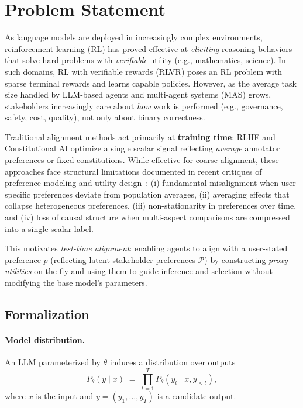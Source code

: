 \documentclass[sigconf]{acmart}
\begin{document}
\section{Problem Statement}\label{sec:problem}

As language models are deployed in increasingly complex environments, reinforcement learning (RL) has proved effective at \emph{eliciting} reasoning behaviors that solve hard problems with \emph{verifiable} utility (e.g., mathematics, science). In such domains, RL with verifiable rewards (RLVR) poses an RL problem with sparse terminal rewards and learns capable policies. However, as the average task size handled by LLM-based agents and multi-agent systems (MAS) grows, stakeholders increasingly care about \emph{how} work is performed (e.g., governance, safety, cost, quality), not only about binary correctness.

Traditional alignment methods act primarily at \textbf{training time}: RLHF and Constitutional AI optimize a single scalar signal reflecting \emph{average} annotator preferences or fixed constitutions. While effective for coarse alignment, these approaches face structural limitations documented in recent critiques of preference modeling and utility design~\cite{sun2024rethinking,zhixuan2024beyond,xu2023rlhf}: (i) fundamental misalignment when user-specific preferences deviate from population averages, (ii) averaging effects that collapse heterogeneous preferences, (iii) non-stationarity in preferences over time, and (iv) loss of causal structure when multi-aspect comparisons are compressed into a single scalar label.

This motivates \emph{test-time alignment}: enabling agents to align with a user-stated preference \(p\) (reflecting latent stakeholder preferences \(\mathcal{P}\)) by constructing \emph{proxy utilities} on the fly and using them to guide inference and selection without modifying the base model’s parameters.

\subsection{Formalization}\label{sec:formalization}

\paragraph{Model distribution.}
An LLM parameterized by \(\theta\) induces a distribution over outputs
\begin{equation}
P_\theta(y \mid x) \;=\; \prod_{t=1}^{T} P_\theta(y_t \mid x, y_{<t}),
\end{equation}
where \(x\) is the input and \(y=(y_1,\dots,y_T)\) is a candidate output.
\end{document}
